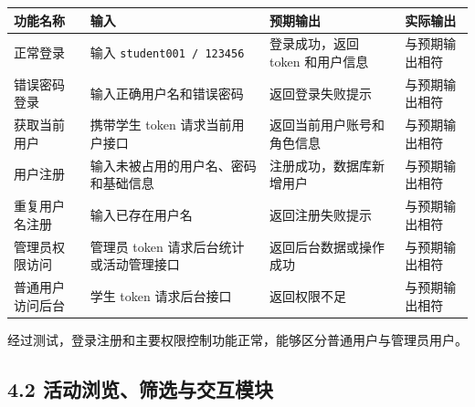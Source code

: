 {\def\LTcaptype{none} %
\begin{longtable}[]{@{}|
  >{\raggedright\arraybackslash}p{}|
  >{\raggedright\arraybackslash}p{}|
  >{\raggedright\arraybackslash}p{}|
  >{\raggedright\arraybackslash}p{}|@{}}
\hline
\rowcolor{gray!12}
\begin{minipage}[b]{\linewidth}\raggedright
\bfseries 功能名称
\end{minipage} & \begin{minipage}[b]{\linewidth}\raggedright
\bfseries 输入
\end{minipage} & \begin{minipage}[b]{\linewidth}\raggedright
\bfseries 预期输出
\end{minipage} & \begin{minipage}[b]{\linewidth}\raggedright
\bfseries 实际输出
\end{minipage} \\
\hline
\endhead
\hline
\endlastfoot
正常登录 & 输入 \passthrough{\lstinline!student001 / 123456!} &
登录成功，返回 token 和用户信息 & 与预期输出相符 \\
\hline
错误密码登录 & 输入正确用户名和错误密码 & 返回登录失败提示 &
与预期输出相符 \\
\hline
获取当前用户 & 携带学生 token 请求当前用户接口 &
返回当前用户账号和角色信息 & 与预期输出相符 \\
\hline
用户注册 & 输入未被占用的用户名、密码和基础信息 &
注册成功，数据库新增用户 & 与预期输出相符 \\
\hline
重复用户名注册 & 输入已存在用户名 & 返回注册失败提示 & 与预期输出相符 \\
\hline
管理员权限访问 & 管理员 token 请求后台统计或活动管理接口 &
返回后台数据或操作成功 & 与预期输出相符 \\
\hline
普通用户访问后台 & 学生 token 请求后台接口 & 返回权限不足 &
与预期输出相符 \\
\hline
\end{longtable}
}

经过测试，登录注册和主要权限控制功能正常，能够区分普通用户与管理员用户。

\subsection{4.2
活动浏览、筛选与交互模块}\label{ux6d3bux52a8ux6d4fux89c8ux7b5bux9009ux4e0eux4ea4ux4e92ux6a21ux5757}

